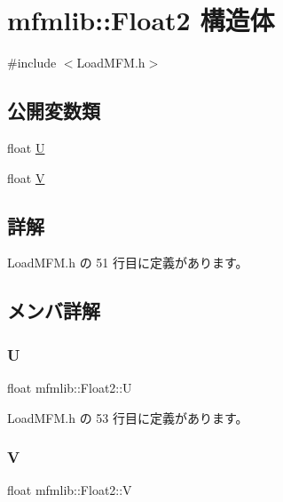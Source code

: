 \hypertarget{structmfmlib_1_1_float2}{}\section{mfmlib\+:\+:Float2 構造体}
\label{structmfmlib_1_1_float2}


{\ttfamily \#include $<$Load\+M\+F\+M.\+h$>$}

\subsection*{公開変数類}
\begin{DoxyCompactItemize}
\item 
float \mbox{\hyperlink{structmfmlib_1_1_float2_af24ca8c716caaeff78dccf93f7974ee3}{U}}
\item 
float \mbox{\hyperlink{structmfmlib_1_1_float2_a270a8750538452dfba45bf5ddf4b5c86}{V}}
\end{DoxyCompactItemize}


\subsection{詳解}


 Load\+M\+F\+M.\+h の 51 行目に定義があります。



\subsection{メンバ詳解}
\mbox{\label{structmfmlib_1_1_float2_af24ca8c716caaeff78dccf93f7974ee3}} 
\subsubsection{\texorpdfstring{U}{U}}
{\footnotesize\ttfamily float mfmlib\+::\+Float2\+::U}



 Load\+M\+F\+M.\+h の 53 行目に定義があります。

\mbox{\label{structmfmlib_1_1_float2_a270a8750538452dfba45bf5ddf4b5c86}} 
\subsubsection{\texorpdfstring{V}{V}}
{\footnotesize\ttfamily float mfmlib\+::\+Float2\+::V}



